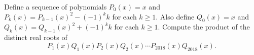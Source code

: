 Define a sequence of polynomials $P_0\left(x\right)=x$ and $P_k\left(x\right)=P_{k-1}\left(x\right)^2-\left(-1\right)^kk$ for each $k\geq1$. Also define $Q_0\left(x\right)=x$ and $Q_k\left(x\right)=Q_{k-1}\left(x\right)^2+\left(-1\right)^kk$ for each $k\geq1$. Compute the product of the distinct real roots of \[P_1\left(x\right)Q_1\left(x\right)P_2\left(x\right)Q_2\left(x\right)\cdots P_{2018}\left(x\right)Q_{2018}\left(x\right).\]